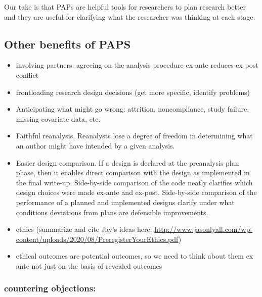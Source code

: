 \documentclass[
]{article}
\providecommand{\tightlist}{%
  \setlength{\itemsep}{0pt}\setlength{\parskip}{0pt}}
\begin{document}
Our take is that PAPs are helpful tools for researchers to plan research
better and they are useful for clarifying what the researcher was
thinking at each stage.

\hypertarget{other-benefits-of-paps}{%
\subsection{Other benefits of PAPS}\label{other-benefits-of-paps}}

\begin{itemize}
\tightlist
\item
  involving partners: agreeing on the analysis procedure ex ante reduces
  ex post conflict
\item
  frontloading research design decisions (get more specific, identify
  problems)
\item
  Anticipating what might go wrong: attrition, noncompliance, study
  failure, missing covariate data, etc.
\item
  Faithful reanalysis. Reanalysts lose a degree of freedom in
  determining what an author might have intended by a given analysis.
\item
  Easier design comparison. If a design is declared at the preanalysis
  plan phase, then it enables direct comparison with the design as
  implemented in the final write-up. Side-by-side comparison of the code
  neatly clarifies which design choices were made ex-ante and ex-post.
  Side-by-side comparison of the performance of a planned and
  implemented designs clarify under what conditions deviations from
  plans are defensible improvements.
\item
  ethics (summarize and cite Jay's ideas here:
  \url{http://www.jasonlyall.com/wp-content/uploads/2020/08/PreregisterYourEthics.pdf})
\item
  ethical outcomes are potential outcomes, so we need to think about
  them ex ante not just on the basis of revealed outcomes
\end{itemize}

\hypertarget{countering-objections}{%
\subsubsection{countering objections:}\label{countering-objections}}
\end{document}
